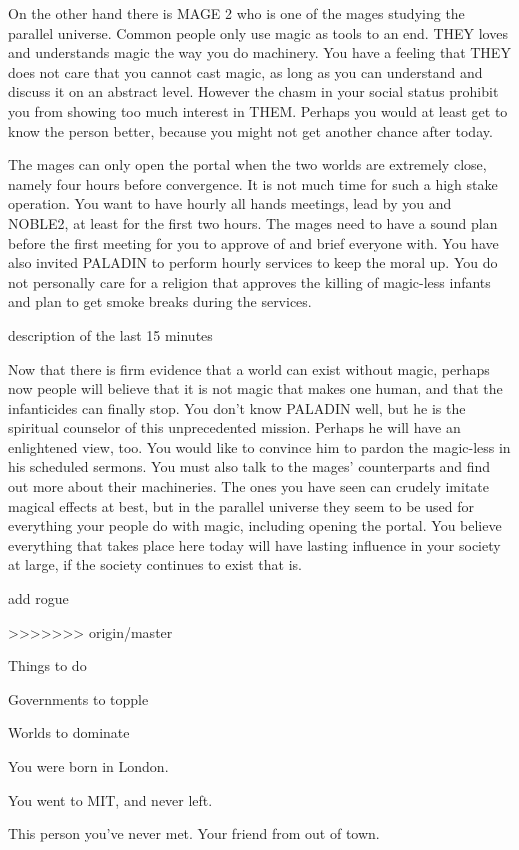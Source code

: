 \documentclass[char]{guildcamp3}
\begin{document}
On the other hand there is MAGE 2 who is one of the mages studying the parallel universe. Common people only use magic as tools to an end. THEY loves and understands magic the way you do machinery. You have a feeling that THEY does not care that you cannot cast magic, as long as you can understand and discuss it on an abstract level. However the chasm in your social status prohibit you from showing too much interest in THEM. Perhaps you would at least get to know the person better, because you might not get another chance after today.

The mages can only open the portal when the two worlds are extremely close, namely four hours before convergence. It is not much time for such a high stake operation. You want to have hourly all hands meetings, lead by you and NOBLE2, at least for the first two hours. The mages need to have a sound plan before the first meeting for you to approve of and brief everyone with. You have also invited PALADIN to perform hourly services to keep the moral up. You do not personally care for a religion that approves the killing of magic-less infants and plan to get smoke breaks during the services.

description of the last 15 minutes 

Now that there is firm evidence that a world can exist without magic, perhaps now people will believe that it is not magic that makes one human, and that the infanticides can finally stop. You don't know PALADIN well, but he is the spiritual counselor of this unprecedented mission. Perhaps he will have an enlightened view, too. You would like to convince him to pardon the magic-less in his scheduled sermons. You must also talk to the mages' counterparts and find out more about their machineries. The ones you have seen can crudely imitate magical effects at best, but in the parallel universe they seem to be used for everything your people do with magic, including opening the portal. You believe everything that takes place here today will have lasting influence in your society at large, if the society continues to exist that is.

add rogue


>>>>>>> origin/master
\begin{itemz}[Goals]
  \item Things to do
  \item Governments to topple
  \item Worlds to dominate
\end{itemz}

\begin{itemz}[Notes]
  \item You were born in London.
  \item You went to MIT, and never left.
\end{itemz}


\begin{contacts}
  \contact{\cNPC{}} This person you've never met.
  \contact{\cSomeGuy{}} Your friend from out of town.
\end{contacts}
\end{document}
